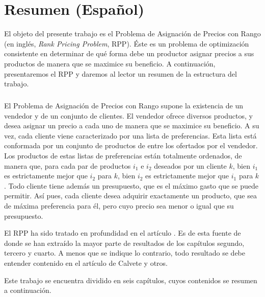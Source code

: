 \pagestyle{plain}

\chapter*{Resumen (Español)} %

El objeto del presente trabajo es el Problema de Asignación de Precios con Rango
(en inglés, \emph{Rank Pricing Problem}, RPP). Éste es un problema de
optimización consistente en determinar de qué forma debe un productor asignar
precios a sus productos de manera que se maximice su beneficio. A continuación,
presentaremos el RPP y daremos al lector un resumen de la estructura del
trabajo.

\paragraph*{}

El Problema de Asignación de Precios con Rango supone la existencia de un
vendedor y de un conjunto de clientes. El vendedor ofrece diversos productos, y
desea asignar un precio a cada uno de manera que se maximice su beneficio. A su
vez, cada cliente viene caracterizado por una lista de preferencias. Esta lista
está conformada por un conjunto de productos de entre los ofertados por el
vendedor. Los productos de estas listas de preferencias están totalmente
ordenados, de manera que, para cada par de productos $i_1$ e $i_2$ deseados por
un cliente $k$, bien $i_1$ es estrictamente mejor que $i_2$ para $k$, bien $i_2$
es estrictamente mejor que $i_1$ para $k$. Todo cliente tiene además un
presupuesto, que es el máximo gasto que se puede permitir. Así pues, cada
cliente desea adquirir exactamente un producto, que sea de máxima preferencia
para él, pero cuyo precio sea menor o igual que su presupuesto.

El RPP ha sido tratado en profundidad en el artículo \cite{ca:rpp}. Es de esta
fuente de donde se han extraído la mayor parte de resultados de los capítulos
segundo, tercero y cuarto. A menos que se indique lo contrario, todo resultado
se debe entender contenido en el artículo de Calvete y otros.

Este trabajo se encuentra dividido en seis capítulos, cuyos contenidos se
resumen a continuación.

\paragraph*{}

